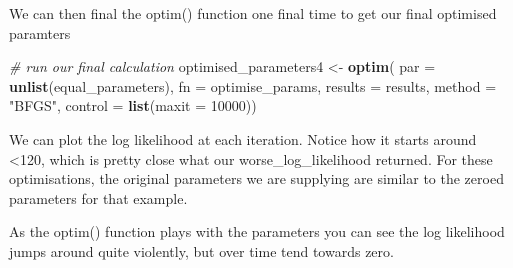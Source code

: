 \documentclass[]{article}
\newenvironment{Shaded}{\begin{snugshade}}{\end{snugshade}}
\newcommand{\KeywordTok}[1]{\textcolor[rgb]{0.13,0.29,0.53}{\textbf{#1}}}
\newcommand{\DataTypeTok}[1]{\textcolor[rgb]{0.13,0.29,0.53}{#1}}
\newcommand{\DecValTok}[1]{\textcolor[rgb]{0.00,0.00,0.81}{#1}}
\newcommand{\StringTok}[1]{\textcolor[rgb]{0.31,0.60,0.02}{#1}}
\newcommand{\CommentTok}[1]{\textcolor[rgb]{0.56,0.35,0.01}{\textit{#1}}}
\newcommand{\OperatorTok}[1]{\textcolor[rgb]{0.81,0.36,0.00}{\textbf{#1}}}
\newcommand{\NormalTok}[1]{#1}
\begin{document}
We can then final the optim() function one final time to get our final
optimised paramters

\begin{Shaded}
\begin{Highlighting}[]
\CommentTok{# run our final calculation}
\NormalTok{optimised_parameters4 <-}\StringTok{ }\KeywordTok{optim}\NormalTok{(}
  \DataTypeTok{par =} \KeywordTok{unlist}\NormalTok{(equal_parameters), }
  \DataTypeTok{fn =}\NormalTok{ optimise_params,}
  \DataTypeTok{results =}\NormalTok{ results,}
  \DataTypeTok{method =} \StringTok{"BFGS"}\NormalTok{,}
  \DataTypeTok{control =} \KeywordTok{list}\NormalTok{(}\DataTypeTok{maxit =} \DecValTok{10000}\NormalTok{))}
\end{Highlighting}
\end{Shaded}

We can plot the log likelihood at each iteration. Notice how it starts
around \textless{}120, which is pretty close what our
worse\_log\_likelihood returned. For these optimisations, the original
parameters we are supplying are similar to the zeroed parameters for
that example.

As the optim() function plays with the parameters you can see the log
likelihood jumps around quite violently, but over time tend towards
zero.

\begin{Shaded}
\end{Shaded}
\end{document}
